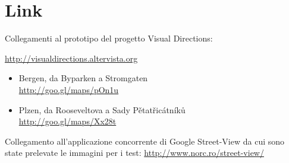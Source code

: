 \documentclass[12pt,a4paper,openright, notitlepage]{report}
\begin{document}
\appendix

\chapter{Link}

Collegamenti al prototipo del progetto Visual Directions: 

\url{http://visualdirections.altervista.org}

\begin{itemize}
	\item Bergen, da Byparken a Stromgaten \\
	\url{http://goo.gl/maps/pOn1u}

	\item Plzen, da Rooseveltova a Sady Pětatřicátníků \\
	\url{http://goo.gl/maps/Xx28t}
\end{itemize}

Collegamento all’applicazione concorrente di Google Street-View da cui sono state prelevate le immagini per i test: \url{http://www.norc.ro/street-view/}




\nocite{*}

\end{document}
